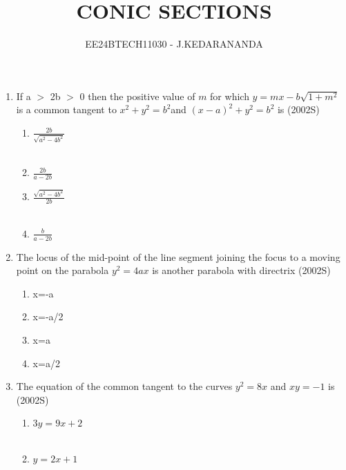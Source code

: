 \documentclass[journal,12pt,twocolumn]{IEEEtran}
\theoremstyle{remark}
\begin{document}

\vspace{3cm}

\title{CONIC SECTIONS}
\author{EE24BTECH11030 - J.KEDARANANDA}
\maketitle
\newpage
\bigskip

\renewcommand{\thefigure}{\theenumi}
\renewcommand{\thetable}{\theenumi}

\begin{enumerate}
\item If a $>$ 2b $>$ 0 then the positive value of $m$ for which       $y=mx-b\sqrt{1+m^{2}} $ is a common tangent to $x^{2} + y^{2} = b^{2} $and  $(x-a)^{2} + y^{2} = b^{2}$ is   \hfill {(2002S)}
\begin{multicols}{2}
\begin{enumerate}
    \item $\frac{2b}{\sqrt{a^{2}-4b^{2}}}$\\\\
    \item $\frac{2b}{a-2b}$
    \item $\frac{\sqrt{a^{2}-4b^{2}}}{2b}$\\\\
    \item $\frac{b}{a-2b}$
\end{enumerate} 
\end{multicols}
\item The locus of the mid-point of the line segment joining the focus to a moving point on the parabola $y^{2} = 4ax$ is another parabola with directrix \hfill{(2002S)}
\begin{multicols}{4}
 \begin{enumerate}
    \item x=-a
    \item x=-a/2
    \item x=a
    \item x=a/2
 \end{enumerate}
\end{multicols}
\item The equation of the common tangent to the curves $y^{2}=8x$ and $xy=-1$ is \hfill{(2002S)}
\begin{multicols}{2}
\begin{enumerate}
    \item $3y=9x+2$\\\\
    \item $y=2x+1$

\end{enumerate}
\end{multicols}
\end{enumerate}
\end{document}
